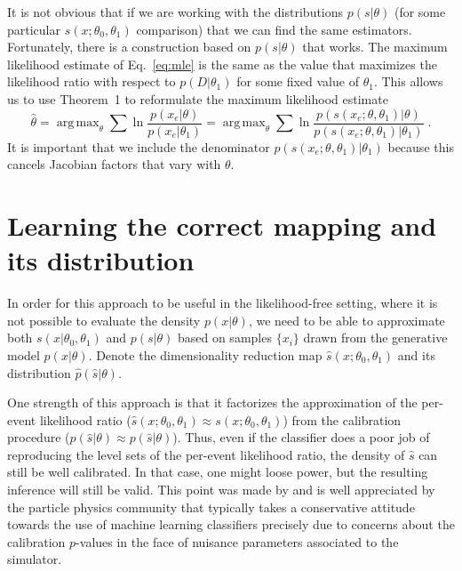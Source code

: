 \documentclass[aoas,preprint]{imsart}
\DeclareMathOperator*{\argmax}{arg\,max}
\numberwithin{equation}{section}
\theoremstyle{plain}
\begin{document}
It is not obvious that if we are working with the distributions $p(s|\theta)$ (for some particular $s(x; \theta_0, \theta_1)$ comparison) that we can find the same estimators. 
Fortunately, there is a construction based on $p(s|\theta)$ that works. The maximum likelihood estimate of Eq.~\ref{eq:mle} is the same as the value that maximizes the likelihood ratio with respect to $p(D|\theta_1)$ for some fixed value of $\theta_1$. This allows us to use Theorem~1 to reformulate the maximum likelihood estimate
\begin{equation}\label{eq:mle_withs}
\hat{\theta} = %
\argmax_\theta  \sum \ln \frac{p(x_e | \theta)}{p(x_e|\theta_1)} = \argmax_\theta  \sum \ln \frac{p(s(x_e; \theta, \theta_1) | \theta)}{p(s(x_e; \theta, \theta_1) |\theta_1)} \; .
\end{equation}
It is important that we include the denominator $p(s(x_e; \theta, \theta_1) |\theta_1)$ because this cancels Jacobian factors that vary with $\theta$.

\section{Learning the correct mapping and its distribution}\label{S:classifier}

In order for this approach to be useful in the likelihood-free setting, where it is not possible to evaluate the density $p(x|\theta)$, we need to be able to approximate both $s(x|\theta_0, \theta_1)$ and $p(s|\theta)$ based on samples $\{x_i\}$ drawn from the generative model $p(x|\theta)$.  Denote the  dimensionality reduction map $\hat{s}(x; \theta_0, \theta_1)$ and its distribution $\hat{p}(\hat{s}|\theta)$. 

One strength of this approach is that it factorizes the approximation of the per-event likelihood ratio ($\hat{s}(x; \theta_0, \theta_1) \approx s(x; \theta_0, \theta_1)$) from the calibration procedure ($\hat p(\hat s| \theta) \approx p(\hat{s}|\theta)$). Thus, even if the classifier does a poor job of reproducing the level sets of the per-event likelihood ratio, the density of $\hat{s}$ can still be well calibrated. In that case, one might loose power, but the resulting inference will still be valid. This point was made by \cite{Neal:2007zz} and is well appreciated by the particle physics community that typically takes a conservative attitude towards the use of machine learning classifiers precisely due to concerns about the calibration $p$-values in the face of nuisance parameters associated to the simulator.
\end{document}
